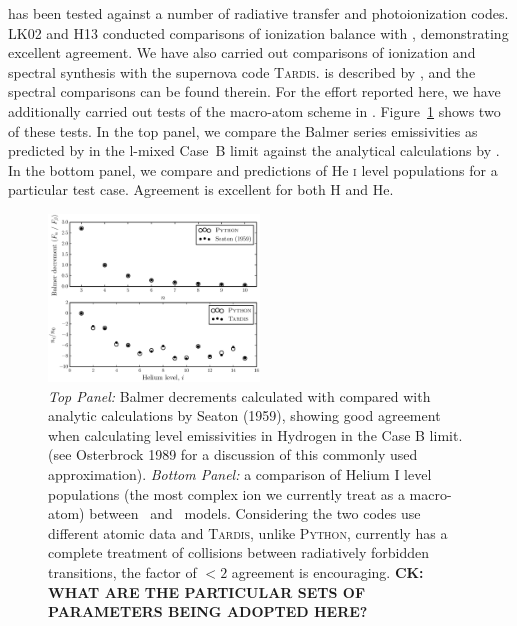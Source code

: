 \documentclass[preprint, a4paper, 11pt]{aastex}
\begin{document}
\py has been tested against a number of radiative transfer and
photoionization codes. LK02 and H13 conducted comparisons of 
ionization balance  with \cld \citep{cloudy2013}, demonstrating
excellent agreement. We have also carried out comparisons
of ionization and spectral synthesis with the supernova code
\textsc{Tardis.} \tar is described by 
\cite{kerzendorfsim}, and the spectral comparisons can be found
therein. For the effort reported here, we have additionally carried
out tests of the macro-atom scheme in \py. Figure~\ref{tests} shows
two of these tests. In the top panel, we compare the Balmer series 
emissivities as predicted by \py in the l-mixed Case~B limit against the
analytical calculations by \cite{seaton1959}. In the bottom panel, we
compare \py and \tar predictions of  He \textsc{i} level populations
for a particular test case. Agreement is excellent for both H and He.

\begin{figure}
\centering
\includegraphics[width=0.5\textwidth]{figures/fig_caseb_tardis.eps}
\caption{
{\sl Top Panel:} Balmer decrements calculated with \py compared with analytic calculations
by Seaton (1959), showing good agreement when calculating level emissivities in Hydrogen
in the Case B limit.
(see Osterbrock 1989 for a discussion of this commonly used approximation).
{\sl Bottom Panel:}  a comparison of Helium I level populations (the most complex ion we currently 
treat as a macro-atom) between \py~and \tar~models. Considering the 
two codes use different atomic data and \textsc{Tardis,} unlike \textsc{Python,} currently has 
a complete treatment of collisions between radiatively forbidden transitions, the factor of 
$<2$ agreement is encouraging. 
{\bf CK: WHAT ARE THE PARTICULAR SETS OF PARAMETERS BEING ADOPTED HERE?}
}
\label{tests}
\end{figure}
\nocite{osterbrock}
\nocite{seaton1959}

%
%
\end{document}
